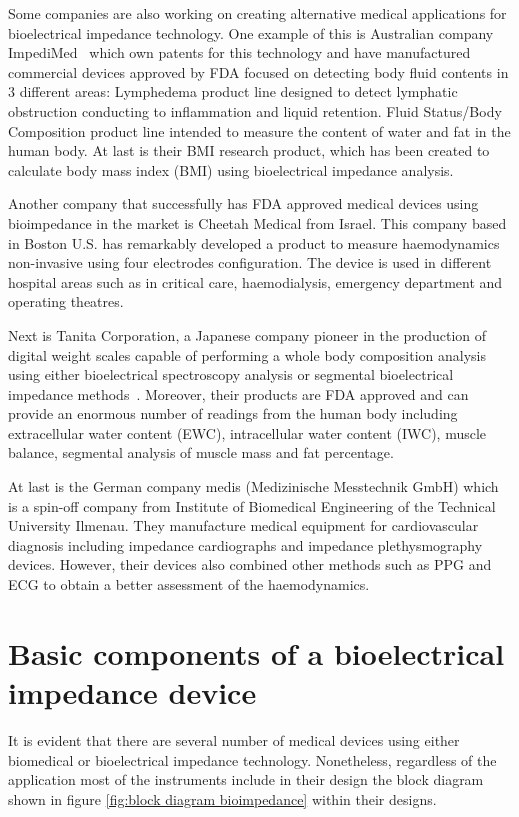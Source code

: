 Some companies are also working on creating alternative medical applications for bioelectrical impedance technology. One example of this is Australian company ImpediMed~\cite{impedimed} which own patents for this technology and have manufactured commercial devices approved by FDA focused on detecting body fluid contents in 3 different areas: Lymphedema product line designed to detect lymphatic obstruction conducting to inflammation and liquid retention.  Fluid Status/Body Composition product line intended to measure the content of water and fat in the human body. At last is their BMI research product, which has been created to calculate body mass index (BMI) using bioelectrical impedance analysis.

Another company that successfully has FDA approved medical devices using bioimpedance in the market is Cheetah Medical \cite{cheetah} from Israel. This company based in Boston U.S. has remarkably developed a product to measure haemodynamics non-invasive using four electrodes configuration. The device is used in different hospital areas such as in critical care, haemodialysis, emergency department and operating theatres.

Next is Tanita Corporation, a Japanese company pioneer in the production of digital weight scales capable of performing a whole body composition analysis using either bioelectrical spectroscopy analysis or segmental bioelectrical impedance methods~\cite{tanita}. Moreover, their products are FDA approved and can provide an enormous number of readings from the human body including extracellular water content (EWC), intracellular water content (IWC), muscle balance, segmental analysis of muscle mass and fat percentage.

At last is the German company medis (Medizinische Messtechnik GmbH) which is a spin-off company from Institute of Biomedical Engineering of the Technical University Ilmenau. They manufacture medical equipment for cardiovascular diagnosis including impedance cardiographs and impedance plethysmography devices. However, their devices also combined other methods such as PPG and ECG to obtain a better assessment of the haemodynamics. 

\section{Basic components of a bioelectrical impedance device}
\label{section impedance 6}
It is evident that there are several number of medical devices using either biomedical or bioelectrical impedance technology. Nonetheless, regardless of the application most of the instruments include in their design the block diagram shown in figure \ref{fig:block diagram bioimpedance} within their designs. 

